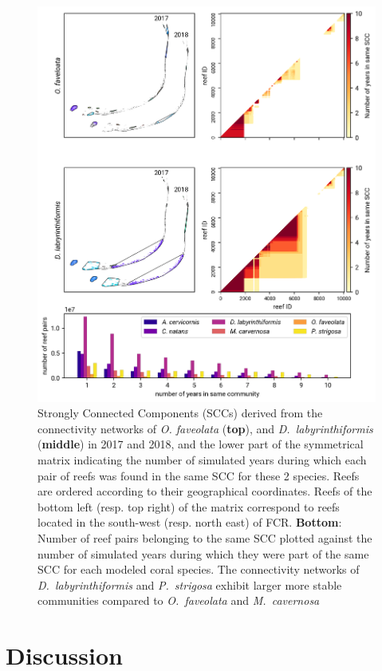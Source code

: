 \documentclass[preprint,12pt,authoryear]{elsarticle}
\begin{document}
\begin{figure}
    \centering
    \includegraphics[width=.9\textwidth]{figures/comparison_sccs.png}
    \caption{Strongly Connected Components (SCCs) derived from the connectivity networks of \textit{O. faveolata} (\textbf{top}), and \textit{D.~labyrinthiformis} (\textbf{middle}) in 2017 and 2018, and the lower part of the symmetrical matrix indicating the number of simulated years during which each pair of reefs was found in the same SCC for these 2 species. Reefs are ordered according to their geographical coordinates. Reefs of the bottom left (resp. top right) of the matrix correspond to reefs located in the south-west (resp. north east) of FCR. \textbf{Bottom}: Number of reef pairs belonging to the same SCC plotted against the number of simulated years during which they were part of the same SCC for each modeled coral species. The connectivity networks of \textit{D.~labyrinthiformis} and \textit{P.~strigosa} exhibit larger more stable communities compared to \textit{O.~faveolata} and \textit{M.~cavernosa}}\label{fig:scc}
\end{figure}


\section*{Discussion}
\end{document}

